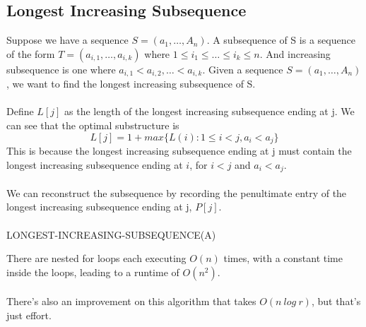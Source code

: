 \documentclass{article}
\begin{document}
    \subsection{Longest Increasing Subsequence}
        Suppose we have a sequence $S = (a_1, \dots, A_n)$. A subsequence of S is a sequence of the form $T = (a_{i,1}, \dots, a_{i,k})$ where $1 \leq i_1 \leq \dots \leq i_k \leq n$. And increasing subsequence is one where $a_{i,1} < a_{i,2}, \dots < a_{i,k}$. Given a sequence $S = (a_1, \dots, A_n)$, we want to find the longest increasing subsequence of S. \\ \\
        Define $L[j]$ as the length of the longest increasing subsequence ending at j. We can see that the optimal substructure is 
        \[ L[j] = 1 + max\{L(i) : 1 \leq i < j, a_i < a_j\} \]
        This is because the longest increasing subsequence ending at j must contain the longest increasing subsequence ending at $i$, for $i < j$ and $a_i < a_j$. \\ \\
        We can reconstruct the subsequence by recording the penultimate entry of the longest increasing subsequence ending at j, $P[j]$. \\ \\
        LONGEST-INCREASING-SUBSEQUENCE(A)
        \begin{algorithmic}[1]
             
                    \EndIf
                \EndFor
                \EndIf
            \EndFor
         
        \EndFor
        \end{algorithmic}
        There are nested for loops each executing $O(n)$ times, with a constant time inside the loops, leading to a runtime of $O(n^2)$.
        \\ \\ There's also an improvement on this algorithm that takes $O(n \: log \: r)$, but that's just effort.
\end{document}
